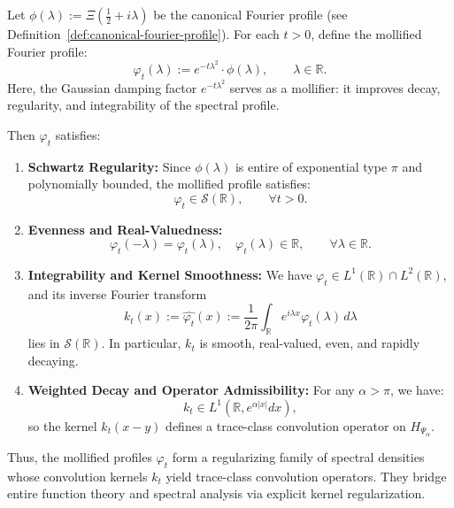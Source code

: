 \begin{definition}
\label{def:mollified_fourier_profile}
Let \( \phi(\lambda) := \Xi\left( \tfrac{1}{2} + i\lambda \right) \) be the canonical Fourier profile (see Definition~\ref{def:canonical-fourier-profile}). For each \( t > 0 \), define the mollified Fourier profile:
\[
\varphi_t(\lambda) := e^{-t\lambda^2} \cdot \phi(\lambda), \qquad \lambda \in \mathbb{R}.
\]
Here, the Gaussian damping factor \( e^{-t\lambda^2} \) serves as a mollifier: it improves decay, regularity, and integrability of the spectral profile.

Then \( \varphi_t \) satisfies:
\begin{enumerate}
  \item \textbf{Schwartz Regularity:} Since \( \phi(\lambda) \) is entire of exponential type \( \pi \) and polynomially bounded, the mollified profile satisfies:
  \[
  \varphi_t \in \mathcal{S}(\mathbb{R}), \qquad \forall t > 0.
  \]

  \item \textbf{Evenness and Real-Valuedness:}
  \[
  \varphi_t(-\lambda) = \varphi_t(\lambda), \quad \varphi_t(\lambda) \in \mathbb{R}, \qquad \forall \lambda \in \mathbb{R}.
  \]

  \item \textbf{Integrability and Kernel Smoothness:} We have \( \varphi_t \in L^1(\mathbb{R}) \cap L^2(\mathbb{R}) \), and its inverse Fourier transform
  \[
  k_t(x) := \widehat{\varphi_t}(x) := \frac{1}{2\pi} \int_{\mathbb{R}} e^{i\lambda x} \varphi_t(\lambda)\, d\lambda
  \]
  lies in \( \mathcal{S}(\mathbb{R}) \). In particular, \( k_t \) is smooth, real-valued, even, and rapidly decaying.

  \item \textbf{Weighted Decay and Operator Admissibility:} For any \( \alpha > \pi \), we have:
  \[
  k_t \in L^1(\mathbb{R}, e^{\alpha|x|} dx),
  \]
  so the kernel \( k_t(x - y) \) defines a trace-class convolution operator on \( H_{\Psi_\alpha} \).
\end{enumerate}

\noindent
Thus, the mollified profiles \( \varphi_t \) form a regularizing family of spectral densities whose convolution kernels \( k_t \) yield trace-class convolution operators. They bridge entire function theory and spectral analysis via explicit kernel regularization.
\end{definition}
